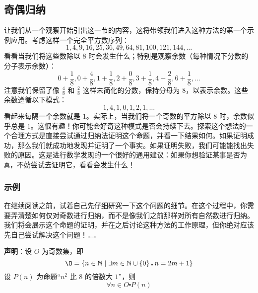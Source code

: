 \subsection{奇偶归纳}

让我们从一个观察开始引出这一节的内容，这将带领我们进入这种方法的第一个示例应用。考虑这样一个完全平方数序列：
\[1, 4, 9, 16, 25, 36, 49, 64, 81, 100, 121, 144, \dots\]
看看当我们将这些数除以 $8$ 时会发生什么；特别是观察余数（每种情况下分数的分子表示余数）：
\[0+\frac{1}{8}, 0+\frac{4}{8}, 1+\frac{1}{8}, 2+\frac{0}{8}, 3+\frac{1}{8}, 4+\frac{2}{8}, 6+\frac{1}{8},  \dots\]
注意我们保留了像 $\frac{4}{8}$ 和 $\frac{2}{8}$ 这样未简化的分数，保持分母为 $8$，以表示余数。这些余数遵循以下模式：
\[1, 4, 1, 0, 1, 2, 1, \dots\]
看起来每隔一个余数就是 $1$。实际上，当我们将一个奇数的平方除以 $8$ 时，余数似乎总是 $1$。这很有趣！你可能会好奇这种模式是否会持续下去。探索这个想法的一个合理方式是直接尝试通过归纳法证明这个命题，并看一下结果如何。如果证明成功，那么我们就成功地发现并证明了一个事实。如果证明失败，我们可能能找出失败的原因。这是进行数学发现的一个很好的通用建议：如果你想验证某事是否为\verb|真|，不妨尝试去证明它，看看会发生什么！

\subsubsection*{示例}

在继续阅读之前，试着自己先仔细研究一下这个问题的细节。在这个过程中，你需要弄清楚如何仅对奇数进行归纳，而不是像我们之前那样对所有自然数进行归纳。我们将会展示这个命题的证明，并在之后讨论这种方法的工作原理，但你绝对应该先自己尝试解决这个问题！…… \\

\begin{example}

   \textbf{声明}：设 $O$ 为奇数集，即
   \[\O = \{n \in \mathbb{N} \mid \exists m \in \mathbb{N} \cup \{0\} \centerdot n = 2m+1\}\]
   设 $P(n)$ 为命题``$n^2$ 比 $8$ 的倍数大 $1$''，则
   \[\forall n \in O \centerdot P(n)\]
\end{example}

